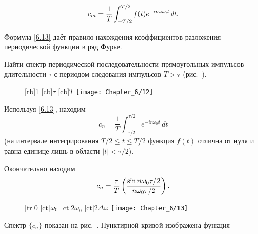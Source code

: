 \begin{equation}
	\eqmark{6.13}
	c_m=\frac{1}{T}\int_{-T/2}^{T/2} f(t)e^{-im\omega_0 t}\,dt.
\end{equation}

Формула \eqref{6.13} даёт правило нахождения коэффициентов разложения периодической функции в ряд Фурье.

 Найти спектр периодической последовательности прямоугольных импульсов длительности $\tau$ с периодом следования импульсов $T>\tau$ (рис.~).

\begin{wrapfigure}[]{r}{0.4\textwidth}
	[rb]{1}
	[cb]{$\tau$}
	[cb]{$T$}
	\texttt{[image: Chapter\_6/12]}
	\caption{}
\end{wrapfigure}
Используя \eqref{6.13}, находим
\begin{equation*}
	c_n =\frac{1}{T}\int_{-\tau/2}^{\tau/2} e^{-in\omega_0 t}\,dt
\end{equation*}
(на интервале интегрирования $T/2\le t \le T/2$ функция $f(t)$ отлична от нуля и равна единице лишь в области
$|t|<\tau/2$). 

%

Окончательно находим
\begin{equation}
	\eqmark{6.14}
	c_n=\frac{\tau}{T}\left(\frac{\sin n\omega_0\tau/2}{n\omega_0\tau/2}\right).
\end{equation}

\begin{figure}[h!]
	\small
	[tr]{0}
	[ct]{$\vphantom{2}\omega_0$}
	[ct]{$2\omega_0$}
	[ct]{$2\Delta\omega$}
	\texttt{[image: Chapter\_6/13]}
	\caption{}
\end{figure}

Спектр $\{c_n\}$ показан на рис.~. Пунктирной кривой изображена функция

